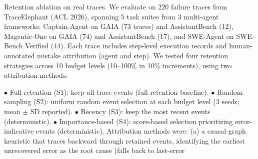 \documentclass[preprint,12pt]{elsarticle}
\begin{document}
Retention ablation on real traces. We evaluate on 220 failure traces from TraceElephant \cite{v5ref6} (ACL 2026), spanning 5 task suites from 3 multi-agent frameworks: Captain-Agent on GAIA (73 traces) and AssistantBench (12), Magentic-One on GAIA (74) and AssistantBench (17), and SWE-Agent on SWE-Bench Verified (44). Each trace includes step-level execution records and human-annotated mistake attribution (agent and step). We tested four retention strategies across 10 budget levels (10--100\% in 10\% increments), using two attribution methods:


$\bullet$ Full retention (S1): keep all trace events (full-retention baseline). $\bullet$ Random sampling (S2): uniform random event selection at each budget level (3 seeds; mean $\pm$ SD reported). $\bullet$ Recency (S3): keep the most recent events (deterministic). $\bullet$ Importance-based (S4): score-based selection prioritizing error-indicative events (deterministic). Attribution methods were: (a) a causal-graph heuristic that traces backward through retained events, identifying the earliest unrecovered error as the root cause (falls back to last-error
\end{document}
